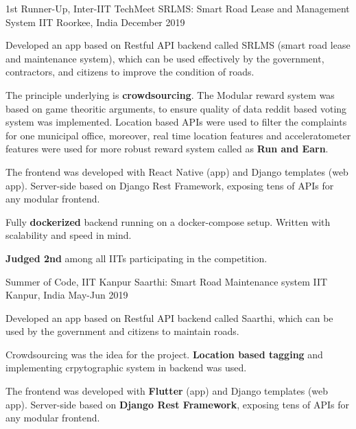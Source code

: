 \begin{cventries}
\cventry
    {1st Runner-Up, Inter-IIT TechMeet} %
    {SRLMS: Smart Road Lease and Management System} %
    {IIT Roorkee, India} %
    {December 2019} %
    {
      \begin{cvitems} %
        \item {Developed an app based on Restful API backend called SRLMS (smart road lease and maintenance system), which can be used effectively by the government, contractors, and citizens to improve the condition of roads.}
        \item {The principle underlying is \textbf{crowdsourcing}. The Modular reward system was based on game theoritic arguments, to ensure quality of data reddit based voting system was implemented. Location based APIs were used to filter the complaints for one municipal office, moreover, real time location features and acceleratometer features were used for more robust reward system called as \textbf{Run and Earn}.}        
        \item {The frontend was developed with React Native (app) and Django templates (web app). Server-side based on Django Rest Framework, exposing tens of APIs for any modular frontend.}        
        \item {Fully \textbf{dockerized} backend running on a docker-compose setup. Written with scalability and speed in mind.}
        \item {\textbf{Judged 2nd} among all IITs participating in the competition.}
      \end{cvitems}
    }
    
\cventry
    {Summer of Code, IIT Kanpur} %
    {Saarthi: Smart Road Maintenance system} %
    {IIT Kanpur, India} %
    {May-Jun 2019} %
    {
      \begin{cvitems} %
        \item {Developed an app based on Restful API backend called Saarthi, which can be used by the government and citizens to maintain roads.}
        \item {Crowdsourcing was the idea for the project. \textbf{Location based tagging} and implementing crpytographic system in backend was used.}
        \item {The frontend was developed with \textbf{Flutter} (app) and Django templates (web app). Server-side based on \textbf{Django Rest Framework}, exposing tens of APIs for any modular frontend.}
      \end{cvitems}
    }


\end{cventries}
